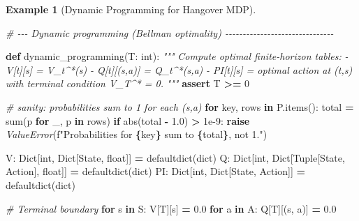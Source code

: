 \documentclass[
]{book}
\newenvironment{Shaded}{\begin{snugshade}}{\end{snugshade}}
\newcommand{\BuiltInTok}[1]{#1}
\newcommand{\CommentTok}[1]{\textcolor[rgb]{0.56,0.35,0.01}{\textit{#1}}}
\newcommand{\ControlFlowTok}[1]{\textcolor[rgb]{0.13,0.29,0.53}{\textbf{#1}}}
\newcommand{\DecValTok}[1]{\textcolor[rgb]{0.00,0.00,0.81}{#1}}
\newcommand{\FloatTok}[1]{\textcolor[rgb]{0.00,0.00,0.81}{#1}}
\newcommand{\KeywordTok}[1]{\textcolor[rgb]{0.13,0.29,0.53}{\textbf{#1}}}
\newcommand{\NormalTok}[1]{#1}
\newcommand{\OperatorTok}[1]{\textcolor[rgb]{0.81,0.36,0.00}{\textbf{#1}}}
\newcommand{\PreprocessorTok}[1]{\textcolor[rgb]{0.56,0.35,0.01}{\textit{#1}}}
\newcommand{\SpecialCharTok}[1]{\textcolor[rgb]{0.81,0.36,0.00}{\textbf{#1}}}
\newcommand{\SpecialStringTok}[1]{\textcolor[rgb]{0.31,0.60,0.02}{#1}}
\theoremstyle{definition}
\theoremstyle{definition}
\newtheorem{example}{Example}[chapter]
\theoremstyle{definition}
\theoremstyle{definition}
\theoremstyle{remark}
\begin{document}
\begin{example}[Dynamic Programming for Hangover MDP]
\begin{Shaded}
\begin{Highlighting}[]
\CommentTok{\# {-}{-}{-} Dynamic programming (Bellman optimality) {-}{-}{-}{-}{-}{-}{-}{-}{-}{-}{-}{-}{-}{-}{-}{-}{-}{-}{-}{-}{-}{-}{-}{-}{-}{-}{-}{-}{-}{-}{-}}

\KeywordTok{def}\NormalTok{ dynamic\_programming(T: }\BuiltInTok{int}\NormalTok{):}
    \CommentTok{"""}
\CommentTok{    Compute optimal finite{-}horizon tables:}
\CommentTok{      {-} V[t][s] = V\_t\^{}*(s)}
\CommentTok{      {-} Q[t][(s,a)] = Q\_t\^{}*(s,a)}
\CommentTok{      {-} PI[t][s] = optimal action at (t,s)}
\CommentTok{    with terminal condition V\_T\^{}* = 0.}
\CommentTok{    """}
    \ControlFlowTok{assert}\NormalTok{ T }\OperatorTok{\textgreater{}=} \DecValTok{0}

    \CommentTok{\# sanity: probabilities sum to 1 for each (s,a)}
    \ControlFlowTok{for}\NormalTok{ key, rows }\KeywordTok{in}\NormalTok{ P.items():}
\NormalTok{        total }\OperatorTok{=} \BuiltInTok{sum}\NormalTok{(p }\ControlFlowTok{for}\NormalTok{ \_, p }\KeywordTok{in}\NormalTok{ rows)}
        \ControlFlowTok{if} \BuiltInTok{abs}\NormalTok{(total }\OperatorTok{{-}} \FloatTok{1.0}\NormalTok{) }\OperatorTok{\textgreater{}} \FloatTok{1e{-}9}\NormalTok{:}
            \ControlFlowTok{raise} \PreprocessorTok{ValueError}\NormalTok{(}\SpecialStringTok{f"Probabilities for }\SpecialCharTok{\{}\NormalTok{key}\SpecialCharTok{\}}\SpecialStringTok{ sum to }\SpecialCharTok{\{}\NormalTok{total}\SpecialCharTok{\}}\SpecialStringTok{, not 1."}\NormalTok{)}

\NormalTok{    V: Dict[}\BuiltInTok{int}\NormalTok{, Dict[State, }\BuiltInTok{float}\NormalTok{]] }\OperatorTok{=}\NormalTok{ defaultdict(}\BuiltInTok{dict}\NormalTok{)}
\NormalTok{    Q: Dict[}\BuiltInTok{int}\NormalTok{, Dict[Tuple[State, Action], }\BuiltInTok{float}\NormalTok{]] }\OperatorTok{=}\NormalTok{ defaultdict(}\BuiltInTok{dict}\NormalTok{)}
\NormalTok{    PI: Dict[}\BuiltInTok{int}\NormalTok{, Dict[State, Action]] }\OperatorTok{=}\NormalTok{ defaultdict(}\BuiltInTok{dict}\NormalTok{)}

    \CommentTok{\# Terminal boundary}
    \ControlFlowTok{for}\NormalTok{ s }\KeywordTok{in}\NormalTok{ S:}
\NormalTok{        V[T][s] }\OperatorTok{=} \FloatTok{0.0}
        \ControlFlowTok{for}\NormalTok{ a }\KeywordTok{in}\NormalTok{ A:}
\NormalTok{            Q[T][(s, a)] }\OperatorTok{=} \FloatTok{0.0}


\end{Highlighting}
\end{Shaded}
\end{example}
\end{document}
